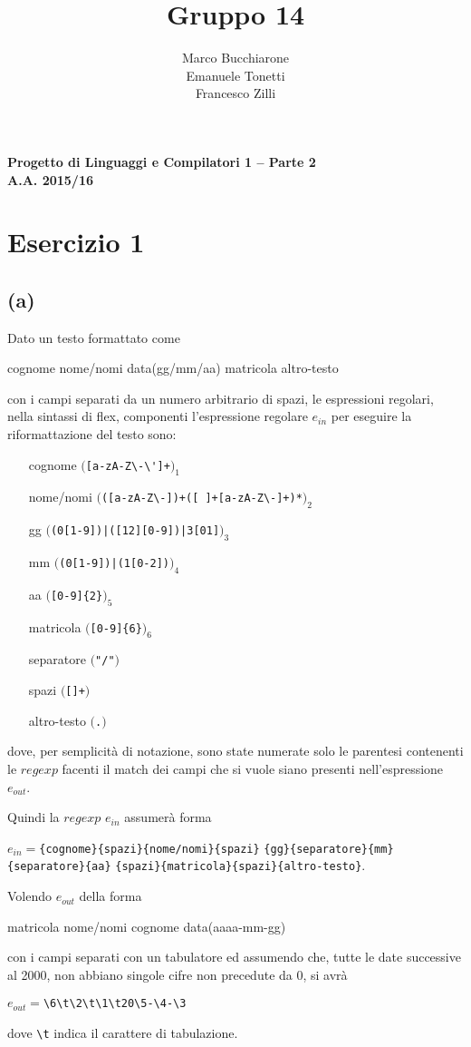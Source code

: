 \documentclass[a4paper,oneside,11pt]{article}
\makeatletter
\renewcommand\and{\\}
\renewcommand\maketitle{%
\bigskip\bigskip\bigskip\bigskip%
\begin{center}\bfseries\large%
Progetto di Linguaggi e Compilatori 1 -- Parte 2 \\ A.A. 2015/16\\%
\end{center}%
\bigskip%
\begin{center}\bfseries\LARGE \@title  \end{center}%
\bigskip%
\begin{center}\bfseries\large \@author \end{center}%
\bigskip\bigskip}
\makeatother
\begin{document}
\title{Gruppo 14}
\author{Marco Bucchiarone \and Emanuele Tonetti \and Francesco Zilli}
\maketitle
%
\section*{Esercizio 1}
\subsection*{(a)}
Dato un testo formattato come 
\begin{center}
cognome  nome/nomi  data(gg/mm/aa)  matricola  altro-testo
\end{center}
con i campi separati da un numero arbitrario di spazi, le espressioni regolari, nella sintassi di flex, componenti l'espressione regolare $e_{in}$ per eseguire la riformattazione del testo sono:
\begin{itemize}
	\item[cognome]		$($\Verb/[a-zA-Z\-\']+/$)_{1}$
	\item[nome/nomi]	$($\Verb/([a-zA-Z\-])+([ ]+[a-zA-Z\-]+)*/$)_{2}$
	\item[gg]		$($\Verb/(0[1-9])|([12][0-9])|3[01]/$)_{3}$ 
	\item[mm]		$($\Verb/(0[1-9])|(1[0-2])/$)_{4}$ 
	\item[aa]		$($\Verb/[0-9]{2}/$)_{5}$ 
	\item[matricola]	$($\Verb/[0-9]{6}/$)_{6}$ 
	\item[separatore]	$($\Verb!"/"!$)$ 
	\item[spazi]		$($\texttt{[\textvisiblespace]+}$)$
	\item[altro-testo]	$($\Verb/./$)$ 
\end{itemize}
dove, per semplicità di notazione, sono state numerate solo le parentesi contenenti le $regexp$ facenti il match dei campi che si vuole siano presenti nell'espressione $e_{out}$.
\newpage
\par
Quindi la $regexp$ $e_{in}$ assumerà forma
\begin{center}
$e_{in} =$\Verb!{cognome}!\Verb!{spazi}!\Verb!{nome/nomi}!\Verb!{spazi}!
\Verb!{gg}!\Verb!{separatore}!\Verb!{mm}!\Verb!{separatore}!\Verb!{aa}!
\Verb!{spazi}!\Verb!{!\Verb!matricola}!\Verb!{spazi}!\Verb!{altro-testo}!.
\end{center}
\par
Volendo $e_{out}$ della forma
\begin{center}
	matricola nome/nomi cognome data(aaaa-mm-gg)
\end{center}
con i campi separati con un tabulatore ed assumendo che, tutte le date successive al 2000, non abbiano singole cifre non precedute da 0, si avrà
\begin{center}
	$e_{out}=$\Verb!\6\t\2\t\1\t20\5-\4-\3!
\end{center}
dove \Verb!\t! indica il carattere di tabulazione.
\end{document}
